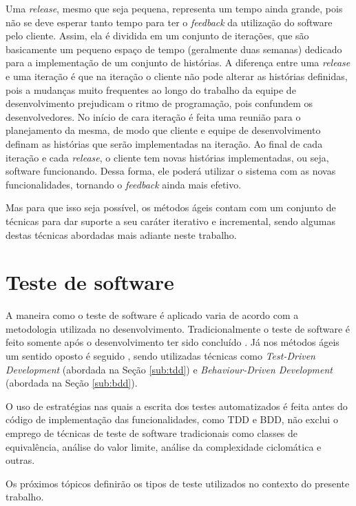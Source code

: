 Uma \textit{release}, mesmo que seja pequena, representa um tempo ainda grande, pois não se deve esperar tanto tempo para ter o \textit{feedback} da utilização do software pelo cliente. Assim, ela é dividida em um conjunto de iterações, que são basicamente um pequeno espaço de tempo (geralmente duas semanas) dedicado para a implementação de um conjunto de histórias. A diferença entre uma \textit{release} e uma iteração é que na iteração o cliente não pode alterar as histórias definidas, pois a mudanças muito frequentes ao longo do trabalho da equipe de desenvolvimento prejudicam o ritmo de programação, pois confundem os desenvolvedores. No início de cara iteração é feita uma reunião para o planejamento da mesma, de modo que cliente e equipe de desenvolvimento definam as histórias que serão implementadas na iteração. Ao final de cada iteração e cada \textit{release}, o cliente tem novas histórias implementadas, ou seja, software funcionando. Dessa forma, ele poderá utilizar o sistema com as novas funcionalidades, tornando o \textit{feedback} ainda mais efetivo.

Mas para que isso seja possível, os métodos ágeis contam com um conjunto de técnicas para dar suporte a seu caráter iterativo e incremental, sendo algumas destas técnicas abordadas mais adiante neste trabalho.


\section{Teste de software}
\label{sec:teste_de_software}

A maneira como o teste de software é aplicado varia de acordo com a metodologia utilizada no desenvolvimento. Tradicionalmente o teste de software é feito somente após o desenvolvimento ter sido concluído \cite{TesteSoftware, Pressman}. Já nos métodos ágeis um sentido oposto é seguido \cite{ArtOfAgileDevelopment}, sendo utilizadas técnicas como \textit{Test-Driven Development} (abordada na Seção \ref{sub:tdd}) e \textit{Behaviour-Driven Development} (abordada na Seção \ref{sub:bdd}).

O uso de estratégias nas quais a escrita dos testes automatizados é feita antes do código de implementação das funcionalidades, como TDD e BDD, não exclui o emprego de técnicas de teste de software tradicionais como classes de equivalência, análise do valor limite, análise da complexidade ciclomática e outras.

Os próximos tópicos definirão os tipos de teste utilizados no contexto do presente trabalho.



